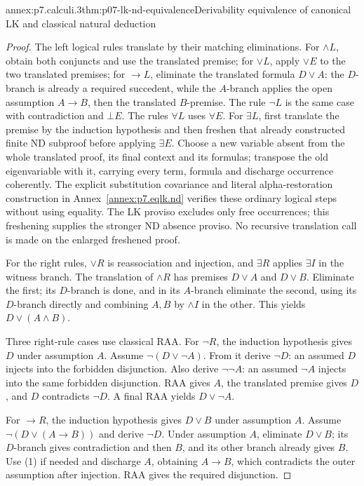 \begin{annexitem}{annex:p7.calculi.3}{thm:p07-lk-nd-equivalence}{Derivability equivalence of canonical LK and classical natural deduction}
\begin{proof}
The left logical rules translate by their matching eliminations.  For
\(\land L\), obtain both conjuncts and use the translated premise; for
\(\lor L\), apply \(\lor E\) to the two translated premises; for
\(\to L\), eliminate the translated formula \(D\lor A\): the \(D\)-branch
is already a required succedent, while the \(A\)-branch applies the open
assumption \(A\to B\), then the translated \(B\)-premise.  The rule
\(\neg L\) is the same case with contradiction and \(\bot E\).  The rules
\(\forall L\) uses \(\forall E\). For \(\exists L\), first translate
the premise by the induction hypothesis and then freshen that already
constructed finite ND subproof before applying \(\exists E\).
Choose a new variable absent from the whole translated proof, its final
context and its formulas; transpose the old eigenvariable with it,
carrying every term, formula and discharge occurrence coherently.
The explicit substitution covariance and literal alpha-restoration
construction in Annex~\ref{annex:p7.eqlk.nd} verifies these ordinary
logical steps without using equality. The LK proviso excludes only free
occurrences; this freshening supplies the stronger ND absence proviso.
No recursive translation call is made on the enlarged freshened proof.

For the right rules, \(\lor R\) is reassociation and injection, and
\(\exists R\) applies \(\exists I\) in the witness branch.  The translation of
\(\land R\) has premises \(D\lor A\) and \(D\lor B\).  Eliminate the first;
its \(D\)-branch is done, and in its \(A\)-branch eliminate the second, using
its \(D\)-branch directly and combining \(A,B\) by \(\land I\) in the other.
This yields \(D\lor(A\land B)\).

Three right-rule cases use classical RAA.  For \(\neg R\), the induction
hypothesis gives \(D\) under assumption \(A\).  Assume
\(\neg(D\lor\neg A)\).  From it derive \(\neg D\): an assumed \(D\) injects
into the forbidden disjunction.  Also derive \(\neg\neg A\): an assumed
\(\neg A\) injects into the same forbidden disjunction.  RAA gives \(A\), the
translated premise gives \(D\), and \(D\) contradicts \(\neg D\).  A final
RAA yields \(D\lor\neg A\).

For \(\to R\), the induction hypothesis gives \(D\lor B\) under assumption
\(A\).  Assume \(\neg(D\lor(A\to B))\) and derive \(\neg D\).  Under
assumption \(A\), eliminate \(D\lor B\); its \(D\)-branch gives
contradiction and then \(B\), and its other branch already gives \(B\).
Use (1) if needed and discharge \(A\), obtaining \(A\to B\), which contradicts
the outer assumption after injection.  RAA gives the required disjunction.


\end{proof}
\end{annexitem}
